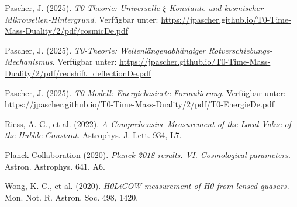 \documentclass[12pt,a4paper]{article}
\begin{document}
	\begin{thebibliography}{99}
		
		Pascher, J. (2025). \textit{T0-Theorie: Universelle $\xi$-Konstante und kosmischer Mikrowellen-Hintergrund}. Verfügbar unter: \url{https://jpascher.github.io/T0-Time-Mass-Duality/2/pdf/cosmicDe.pdf}
		
		Pascher, J. (2025). \textit{T0-Theorie: Wellenlängenabhängiger Rotverschiebungs-Mechanismus}. Verfügbar unter: \url{https://jpascher.github.io/T0-Time-Mass-Duality/2/pdf/redshift_deflectionDe.pdf}
		
		Pascher, J. (2025). \textit{T0-Modell: Energiebasierte Formulierung}. Verfügbar unter: \url{https://jpascher.github.io/T0-Time-Mass-Duality/2/pdf/T0-EnergieDe.pdf}
		
		Riess, A. G., et al. (2022). \textit{A Comprehensive Measurement of the Local Value of the Hubble Constant}. Astrophys. J. Lett. 934, L7.
		
		Planck Collaboration (2020). \textit{Planck 2018 results. VI. Cosmological parameters}. Astron. Astrophys. 641, A6.
		
		Wong, K. C., et al. (2020). \textit{H0LiCOW measurement of H0 from lensed quasars}. Mon. Not. R. Astron. Soc. 498, 1420.
		
	\end{thebibliography}
	
\end{document}
